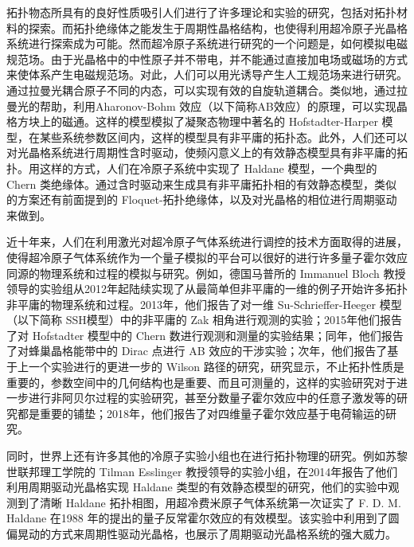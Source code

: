 拓扑物态所具有的良好性质吸引人们进行了许多理论和实验的研究，包括对拓扑材料的探索。而拓扑绝缘体之能发生于周期性晶格结构，也使得利用超冷原子光晶格系统进行探索成为可能。然而超冷原子系统进行研究的一个问题是，如何模拟电磁规范场。由于光晶格中的中性原子并不带电，并不能通过直接加电场或磁场的方式来使体系产生电磁规范场。对此，人们可以用光诱导产生人工规范场\cite{lightgauge2014}来进行研究。通过拉曼光耦合原子不同的内态，可以实现有效的自旋轨道耦合。类似地，通过拉曼光的帮助，利用Aharonov-Bohm 效应（以下简称AB效应）的原理，可以实现晶格方块上的磁通\cite{harper1,harper2}。这样的模型模拟了凝聚态物理中著名的 Hofstadter-Harper 模型\cite{topobook}，在某些系统参数区间内，这样的模型具有非平庸的拓扑态\cite{topobook}。此外，人们还可以对光晶格系统进行周期性含时驱动，使频闪意义上的有效静态模型具有非平庸的拓扑。用这样的方式，人们在冷原子系统中实现了 Haldane 模型\cite{haldane-expr-2014}，一个典型的 Chern 类绝缘体。通过含时驱动来生成具有非平庸拓扑相的有效静态模型，类似的方案还有前面提到的 Floquet-拓扑绝缘体\cite{floq-ti-2011}，以及对光晶格的相位进行周期驱动来做到\cite{zhengwei-floquet-2014}。

近十年来，人们在利用激光对超冷原子气体系统进行调控的技术方面取得的进展，使得超冷原子气体系统作为一个量子模拟的平台可以很好的进行许多量子霍尔效应同源的物理系统和过程的模拟与研究\cite{topo2016zoller}。例如，德国马普所的 Immanuel Bloch 教授领导的实验组从2012年起陆续实现了从最简单但非平庸的一维的例子开始许多拓扑非平庸的物理系统和过程。2013年，他们报告了对一维 Su-Schrieffer-Heeger 模型（以下简称 SSH模型）\cite{ssh1979}中的非平庸的 Zak 相角\cite{zak1989}进行观测的实验\cite{zak-expr-2013}；2015年他们报告了对 Hofstadter 模型中的 Chern 数\cite{chern-expr-2015}进行观测和测量的实验结果；同年，他们报告了对蜂巢晶格能带中的 Dirac 点进行 AB 效应的干涉实验\cite{ab-expr-2015}；次年，他们报告了基于上一个实验进行的更进一步的 Wilson 路径的研究\cite{wilsonline-expr-2016}，研究显示，不止拓扑性质是重要的，参数空间中的几何结构也是重要、而且可测量的，这样的实验研究对于进一步进行非阿贝尔过程的实验研究，甚至分数量子霍尔效应中的任意子激发等的研究都是重要的铺垫；2018年，他们报告了对四维量子霍尔效应基于电荷输运的研究\cite{4dqhall-expr-2018}。

同时，世界上还有许多其他的冷原子实验小组也在进行拓扑物理的研究。例如苏黎世联邦理工学院的 Tilman Esslinger 教授领导的实验小组，在2014年报告了他们利用周期驱动光晶格实现 Haldane 类型的有效静态模型的研究\cite{haldane-expr-2014}，他们的实验中观测到了清晰 Haldane 拓扑相图，用超冷费米原子气体系统第一次证实了 F. D. M. Haldane 在1988 年的提出的量子反常霍尔效应的有效模型\cite{haldane1988}。该实验中利用到了圆偏晃动的方式来周期性驱动光晶格，也展示了周期驱动光晶格系统的强大威力。

